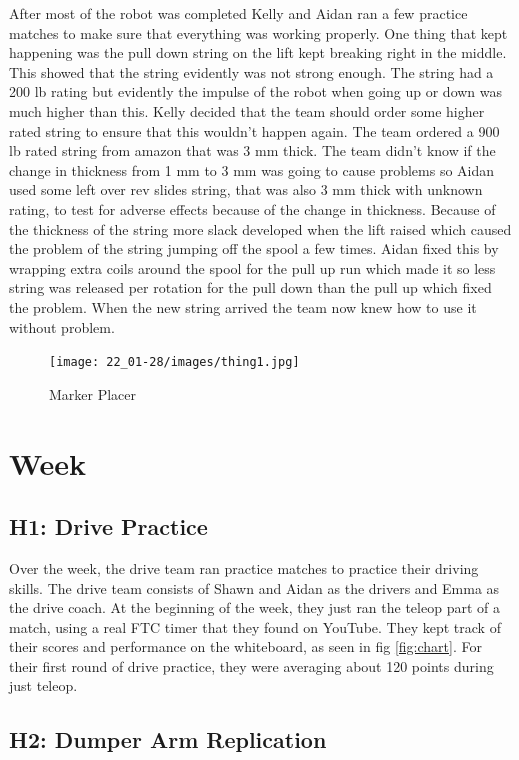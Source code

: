\documentclass{article}
\begin{document}
After most of the robot was completed Kelly and Aidan ran a few practice matches to make sure that everything was working properly. One thing that kept happening was the pull down string on the lift kept breaking right in the middle. This showed that the string evidently was not strong enough. The string had a 200 lb rating but evidently the impulse of the robot when going up or down was much higher than this. Kelly decided that the team should order some higher rated string to ensure that this wouldn't happen again. The team ordered a 900 lb rated string from amazon that was 3 mm thick. The team didn't know if the change in thickness from 1 mm  to 3 mm was going to cause problems so Aidan used some left over rev slides string, that was also 3 mm thick with unknown rating, to test for adverse effects because of the change in thickness. Because of the thickness of the string more slack developed when the lift raised which caused the problem of the string jumping off the spool a few times. Aidan fixed this by wrapping extra coils around the spool for the pull up run which made it so less string was released per rotation for the pull down than the pull up which fixed the problem. When the new string arrived the team now knew how to use it without problem.

\begin{figure}
    \centering
    \texttt{[image: 22\_01-28/images/thing1.jpg]}
    \caption{Marker Placer}
    \label{fig:markerplacer}
\end{figure}
\clearpage \newpage \section{Week \thesection} 
\subsection{H1: Drive Practice}

Over the week, the drive team ran practice matches to practice their driving skills. The drive team consists of Shawn and Aidan as the drivers and Emma as the drive coach. At the beginning of the week, they just ran the teleop part of a match, using a real FTC timer that they found on YouTube. They kept track of their scores and performance on the whiteboard, as seen in fig \ref{fig:chart}. For their first round of drive practice, they were averaging about 120 points during just teleop.

\subsection{H2: Dumper Arm Replication}
\end{document}
